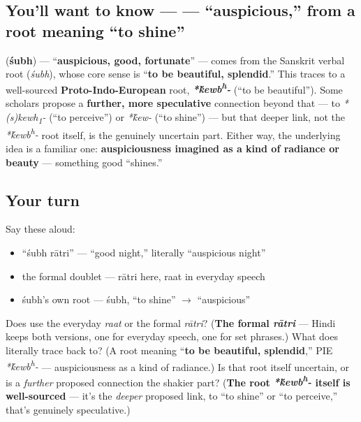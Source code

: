 \subsection*{You'll want to know —  — \textquotedblleft{}auspicious,\textquotedblright{} from a root meaning \textquotedblleft{}to shine\textquotedblright{}}
\textbf{} (\textbf{śubh}) — \textquotedblleft{}\textbf{auspicious, good, fortunate}\textquotedblright{} — comes from the Sanskrit verbal root \textbf{} (\emph{śubh}), whose core sense is \textquotedblleft{}\textbf{to be beautiful, splendid}.\textquotedblright{} This traces to a well-sourced \textbf{Proto-Indo-European} root, \emph{\textbf{*\'{k}ewb\textsuperscript{h}-}} (\textquotedblleft{}to be beautiful\textquotedblright{}). Some scholars propose a \textbf{further, more speculative} connection beyond that — to \emph{*(s)kewh\textsubscript{1}-} (\textquotedblleft{}to perceive\textquotedblright{}) or \emph{*\'{k}ew-} (\textquotedblleft{}to shine\textquotedblright{}) — but that deeper link, not the \emph{*\'{k}ewb\textsuperscript{h}-} root itself, is the genuinely uncertain part. Either way, the underlying idea is a familiar one: \textbf{auspiciousness imagined as a kind of radiance or beauty} — something good \textquotedblleft{}shines.\textquotedblright{}

\subsection*{Your turn}
Say these aloud:

\begin{itemize}
\raggedright
  \item \textquotedblleft{}śubh rātri\textquotedblright{} — \textquotedblleft{}good night,\textquotedblright{} literally \textquotedblleft{}auspicious night\textquotedblright{}
  \item the formal doublet — rātri here, raat in everyday speech
  \item śubh's own root — śubh, \textquotedblleft{}to shine\textquotedblright{} $\to$ \textquotedblleft{}auspicious\textquotedblright{}
\end{itemize}

\begin{tcolorbox}[breakable,colback=teal!4,colframe=teal!35!black,title={Before you move on}]
Does \textbf{ } use the everyday \emph{raat} or the formal \emph{rātri}? (\textbf{The formal \emph{rātri}} — Hindi keeps both versions, one for everyday speech, one for set phrases.) What does \textbf{} literally trace back to? (A root meaning \textquotedblleft{}\textbf{to be beautiful, splendid},\textquotedblright{} PIE \emph{*\'{k}ewb\textsuperscript{h}-} — auspiciousness as a kind of radiance.) Is that root itself uncertain, or is a \emph{further} proposed connection the shakier part? (\textbf{The root \emph{*\'{k}ewb\textsuperscript{h}-} itself is well-sourced} — it's the \emph{deeper} proposed link, to \textquotedblleft{}to shine\textquotedblright{} or \textquotedblleft{}to perceive,\textquotedblright{} that's genuinely speculative.)
\end{tcolorbox}
